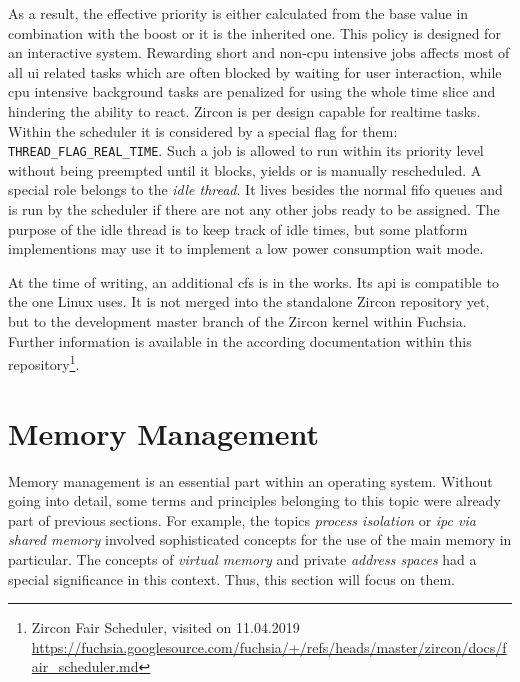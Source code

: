 As a result, the effective priority is either calculated from the base value in combination with the boost or it is the inherited one\cite{zircon-scheduling}.
This policy is designed for an interactive system.
Rewarding short and non-\ac{cpu} intensive jobs affects most of all \ac{ui} related tasks which are often blocked by waiting for user interaction, while \ac{cpu} intensive background tasks are penalized for using the whole time slice and hindering the ability to react.
%
Zircon is per design capable for realtime tasks.
Within the scheduler it is considered by a special flag for them: \texttt{THREAD\_FLAG\_REAL\_TIME}.
Such a job is allowed to run within its priority level without being preempted until it blocks, yields or is manually rescheduled\cite{zircon-scheduling}.
%
A special role belongs to the \textit{idle thread}.
It lives besides the normal \ac{fifo} queues and is run by the scheduler if there are not any other jobs ready to be assigned.
The purpose of the idle thread is to keep track of idle times, but some platform implementions may use it to implement a low power consumption wait mode\cite{zircon-scheduling}.

At the time of writing, an additional \ac{cfs} is in the works.
Its \ac{api} is compatible to the one Linux uses.
It is not merged into the standalone Zircon repository yet, but to the development master branch of the Zircon kernel within Fuchsia.
Further information is available in the according documentation within this repository\footnote{Zircon Fair Scheduler, visited on 11.04.2019\\ \url{https://fuchsia.googlesource.com/fuchsia/+/refs/heads/master/zircon/docs/fair_scheduler.md}}.


\section{Memory Management}\label{sec:memory-management}
Memory management is an essential part within an operating system.
Without going into detail, some terms and principles belonging to this topic were already part of previous sections.
For example, the topics \textit{process isolation} or \textit{\ac{ipc} via shared memory} involved sophisticated concepts for the use of the main memory in particular.
The concepts of \textit{virtual memory} and private \textit{address spaces} had a special significance in this context.
Thus, this section will focus on them.

